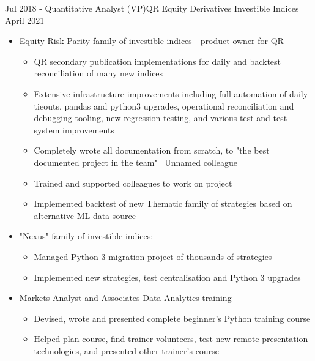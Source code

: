 \begin{experiences}
  \experience
    {Jul 2018 -}   {Quantitative Analyst (VP)}{QR Equity Derivatives Investible Indices}
    {April 2021} {
        \begin{itemize}
            \item Equity Risk Parity family of investible indices - product owner for QR
            
            \begin{itemize}
                \item QR secondary publication implementations for daily and backtest reconciliation of many new indices
                \item Extensive infrastructure improvements including full automation of daily tieouts, pandas and python3 upgrades, operational reconciliation and debugging tooling, new regression testing, and various test and test system improvements
                \item Completely wrote all documentation from scratch, to "the best documented project in the team" ~Unnamed colleague
                \item Trained and supported colleagues to work on project
                \item Implemented backtest of new Thematic family of strategies based on alternative ML data source
            \end{itemize}
            
            \item "Nexus" family of investible indices:

            \begin{itemize}
                \item Managed Python 3 migration project of thousands of strategies
                \item Implemented new strategies, test centralisation and Python 3 upgrades
            \end{itemize}
            
            \item Markets Analyst and Associates Data Analytics training
            \begin{itemize}
                \item Devised, wrote and presented complete beginner's Python training course
                \item Helped plan course, find trainer volunteers, test new remote presentation technologies, and presented other trainer's course
            \end{itemize}


\end{itemize}}
\end{experiences}
